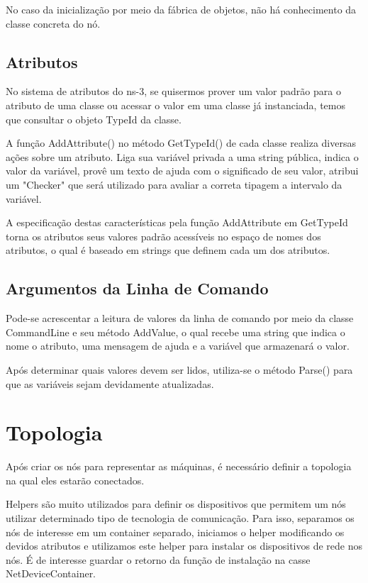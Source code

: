 \documentclass[14pt]{extarticle}
\begin{document}
No caso da inicialização por meio da fábrica de objetos, não há conhecimento da classe concreta do nó.

\subsection{Atributos}

No sistema de atributos do ns-3, se quisermos prover um valor padrão para o atributo de uma classe ou acessar o valor em
uma classe já instanciada, temos que consultar o objeto TypeId da classe.

A função AddAttribute() no método GetTypeId() de cada classe realiza diversas ações sobre um atributo. Liga sua variável
privada a uma string pública, indica o valor da variável, provê um texto de ajuda com o significado de seu valor,
atribui um "Checker" que será utilizado para avaliar a correta tipagem a intervalo da variável.

A especificação destas características pela função AddAttribute em GetTypeId torna os atributos seus valores padrão
acessíveis no espaço de nomes dos atributos, o qual é baseado em strings que definem cada um dos atributos.

\subsection{Argumentos da Linha de Comando}

Pode-se acrescentar a leitura de valores da linha de comando por meio da classe CommandLine e seu método AddValue, o
qual recebe uma string que indica o nome o atributo, uma mensagem de ajuda e a variável que armazenará o valor.

Após determinar quais valores devem ser lidos, utiliza-se o método Parse() para que as variáveis sejam devidamente
atualizadas.

\section{Topologia}
Após criar os nós para representar as máquinas, é necessário definir a topologia na qual eles estarão conectados.

Helpers são muito utilizados para definir os dispositivos que permitem um nós utilizar determinado tipo de tecnologia de
comunicação. Para isso, separamos os nós de interesse em um container separado, iniciamos o helper modificando os
devidos atributos e utilizamos este helper para instalar os dispositivos de rede nos nós. É de interesse guardar o
retorno da função de instalação na casse NetDeviceContainer.
\end{document}

